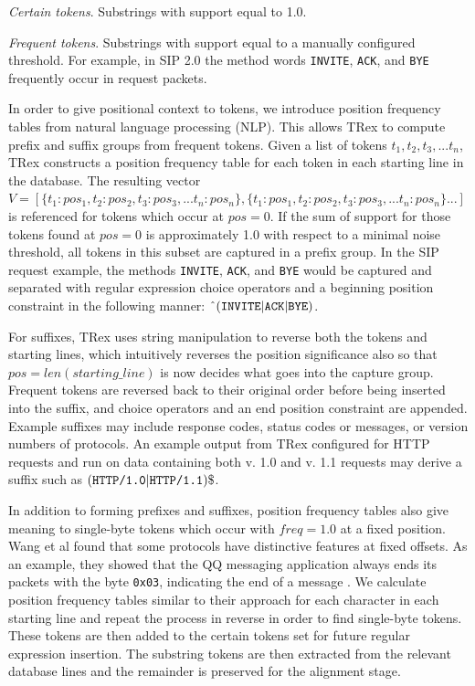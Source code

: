 \textit{Certain tokens}. Substrings with support equal to 1.0. \par
\textit{Frequent tokens}. Substrings with support equal to a manually configured threshold. For example, in SIP 2.0 the method words \texttt{INVITE}, \texttt{ACK}, and \texttt{BYE} frequently occur in request packets. \par

In order to give positional context to tokens, we introduce position frequency tables from natural language processing (NLP). This allows TRex to compute prefix and suffix groups from frequent tokens. Given a list of tokens $t_{1}, t_{2}, t_{3},...t_{n}$, TRex constructs a position frequency table for each token in each starting line in the database. The resulting vector $V=[\{ t_{1}:pos_{1}, t_{2}:pos_{2}, t_{3}:pos_{3},...t_{n}:pos_{n}\}, \{ t_{1}:pos_{1}, t_{2}:pos_{2}, t_{3}:pos_{3},...t_{n}:pos_{n}\}...]$ is referenced for tokens which occur at $pos=0$. If the sum of support for those tokens found at $pos=0$ is approximately 1.0 with respect to a minimal noise threshold, all tokens in this subset are captured in a prefix group. In the SIP request example, the methods \texttt{INVITE}, \texttt{ACK}, and \texttt{BYE} would be captured and separated with regular expression choice operators and a beginning position constraint in the following manner: $\string^\text{(\texttt{INVITE}}\vert\text{\texttt{ACK}}\vert\text{\texttt{BYE}}\text{)}$. \par

For suffixes, TRex uses string manipulation to reverse both the tokens and starting lines, which intuitively reverses the position significance also so that $pos=len(starting\_line)$ is now decides what goes into the capture group. Frequent tokens are reversed back to their original order before being inserted into the suffix, and choice operators and an end position constraint are appended. Example suffixes may include response codes, status codes or messages, or version numbers of protocols. An example output from TRex configured for HTTP requests and run on data containing both v. 1.0 and v. 1.1 requests may derive a suffix such as $\text{(\texttt{HTTP/1.0}}\vert\text{\texttt{HTTP/1.1}}\text{)\$}$.

In addition to forming prefixes and suffixes, position frequency tables also give meaning to single-byte tokens which occur with $freq=1.0$ at a fixed position. Wang et al found that some protocols have distinctive features at fixed offsets. As an example, they showed that the QQ messaging application always ends its packets with the byte \texttt{0x03}, indicating the end of a message \cite{WANG2012992}. We calculate position frequency tables similar to their approach for each character in each starting line and repeat the process in reverse in order to find single-byte tokens. These tokens are then added to the certain tokens set for future regular expression insertion. The substring tokens are then extracted from the relevant database lines and the remainder is preserved for the alignment stage.


